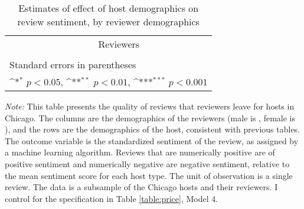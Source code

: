 \begin{landscape}
	\begin{table}[htbp]\centering
		\def\sym#1{\ifmmode^{#1}\else\(^{#1}\)\fi}
		\caption{Estimates of effect of host demographics on review sentiment, by reviewer demographics}
		\begin{tabular}{l *{9}{c}}
			\hline\hline
			&\multicolumn{9}{c}{Reviewers} \\
			\cmidrule(r){3-10}\\
				
			\hline\hline
			\multicolumn{10}{l}{\footnotesize Standard errors in parentheses}\\
			\multicolumn{10}{l}{\footnotesize \sym{*} \(p<0.05\), \sym{**} \(p<0.01\), \sym{***} \(p<0.001\)}\\
		\end{tabular}
		\label{table:sentiment}
		
		\begin{tablenotes}
			
			\item {\it Note:} This table presents the quality of reviews that reviewers leave for hosts in Chicago. The columns are the demographics of the reviewers (male is , female is ), and the rows are the demographics of the host, consistent with previous tables. The outcome variable is the standardized sentiment of the review, as assigned by a machine learning algorithm. Reviews that are numerically positive are of positive sentiment and numerically negative are negative sentiment, relative to the mean sentiment score for each host type. The unit of observation is a single review. The data is a subsample of the Chicago hosts and their reviewers. I control for the specification in Table \ref{table:price}, Model 4.
			
		\end{tablenotes}
		
	\end{table}
\end{landscape}


